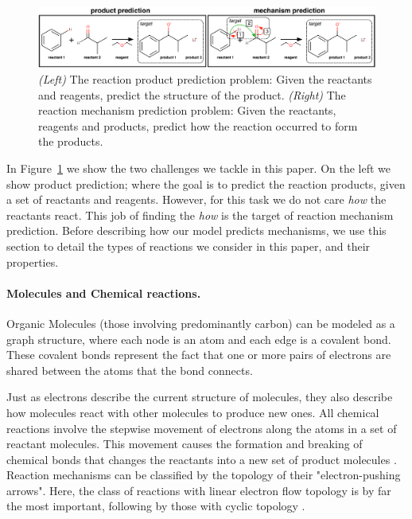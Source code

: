

\begin{figure}[t!]
\centering
\includegraphics[width=\textwidth]{reaction_diagram}
\caption{\emph{(Left)} The reaction product prediction problem: Given the reactants and reagents, predict the structure of the product. \emph{(Right)} The reaction mechanism prediction problem: Given the reactants, reagents and products, predict how the reaction occurred to form the products.}
\label{fig:task-overview}
\end{figure}


In Figure~\ref{fig:task-overview} we show the two challenges we tackle in this paper. 
On the left we show product prediction; where the goal is to predict the reaction products, given a set of reactants and reagents. However, for this task we do not care {\em how} the reactants react.
 This job of finding the {\em how} is the target of reaction mechanism prediction. 
 Before describing how our model predicts mechanisms, we use this section to detail the types of reactions we consider in this paper, and their properties.



\vspace{-0.15cm}
\paragraph{Molecules and Chemical reactions.}


Organic Molecules (those involving predominantly carbon) can be modeled as a graph structure, where each node is an atom and each edge is a covalent bond.
These covalent bonds represent the fact that 
one or more pairs of electrons are shared between the atoms that the bond connects. 


Just as electrons describe the current structure of molecules, 
they also describe how molecules react with other molecules to produce new ones. All chemical reactions involve the stepwise movement of electrons along the atoms in a set of reactant molecules. 
This movement causes the formation and breaking of chemical bonds that changes the reactants into a new set of product molecules \cite{herges1994coarctate}. 
Reaction mechanisms can be classified by the topology of their "electron-pushing arrows". Here, the class of reactions with linear electron flow topology is by far the most important, following by those with cyclic topology \citep{herges1994coarctate}.

